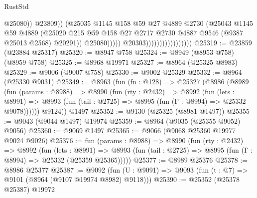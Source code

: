 \begin{lexlean}{RustStd}
\begin{coremodule}
                                                      @25080))
                                                  @23809))
                                              (@25035
                                                @1145
                                                @158
                                                @59
                                                @27
                                                @4889
                                                @2730
                                                (@25043
                                                  @1145
                                                  @59
                                                  @4889
                                                  (@25020
                                                    @215
                                                    @59
                                                    @158
                                                    @27
                                                    @2717
                                                    @2730
                                                    @4887
                                                    @9546
                                                    (@9387 @25013 @2568)
                                                    @20291))
                                                @25080)))))
                                      @20303)))))))))))))))))
@25319 := @23859 (@23884 @25317)
@25320 := @8947 @758
@25324 := @8949 (@8953 @758) (@8959 @758)
@25325 := @8968 @19971
@25327 := @8964 (@25325 @8983)
@25329 := @9006 (@9007 @758)
@25330 := @9002 @25329
@25332 := @8964 (@25330 @9031)
@25349 := @8963
    (fun (fn : @128) =>
    @25327
      (@8986
        (@8989
          (fun (params : @8988) =>
          @8990
            (fun (rty : @2432) =>
            @8992
              (fun (lets : @8991) =>
              @8993 (fun (tail : @2725) => @8995 (fun (Γ : @8994) => @25332 @9078))))))
        @9124))
    @1497
@25352 := @9130 (@25325 (@8981 @1497))
@25355 := @9043 (@9044 @1497) @19974
@25359 := @8964 (@9035 (@25355 @9052) @9056)
@25360 := @9069 @1497
@25365 := @9066 (@9068 @25360 @19977 @9024 @9026)
@25376 := fun (params : @8988) =>
  @8990
    (fun (rty : @2432) =>
    @8992
      (fun (lets : @8991) =>
      @8993 (fun (tail : @2725) => @8995 (fun (Γ : @8994) => @25332 (@25359 @25365)))))
@25377 := @8989 @25376
@25378 := @8986 @25377
@25387 := @9092
    (fun (U : @9091) => @9093 (fun (t : @7) => @9101 (@8964 (@9107 @19974 @8982) @9118)))
@25390 := @25352 (@25378 @25387) @19972

\end{coremodule}
\end{lexlean}
